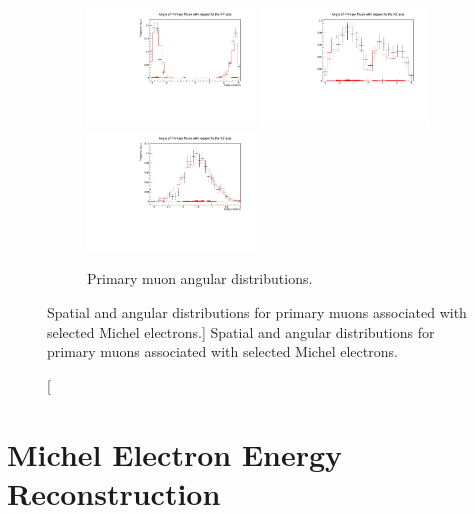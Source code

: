 \begin{figure}
	\begin{subfigure}[b]{\textwidth}
		\centering
		\vspace{1cm}
		\includegraphics[width=0.49\textwidth]{figures/DataVMC_angle_xy.pdf}
		\hfill
		\includegraphics[width=0.49\textwidth]{figures/DataVMC_angle_xz.pdf}
		\includegraphics[width=0.49\textwidth]{figures/DataVMC_angle_yz.pdf}
		\caption {Primary muon angular distributions.}
		\label{fig:muon_angles}
	\end{subfigure}
	

	\caption
	[Spatial and angular distributions for primary muons associated with selected
	Michel electrons.]
	{Spatial and angular distributions for primary muons associated with selected
	Michel electrons.}

	\label{fig:muon_distributions}

\end{figure}

\section{Michel Electron Energy Reconstruction} \label{ME_R} 

